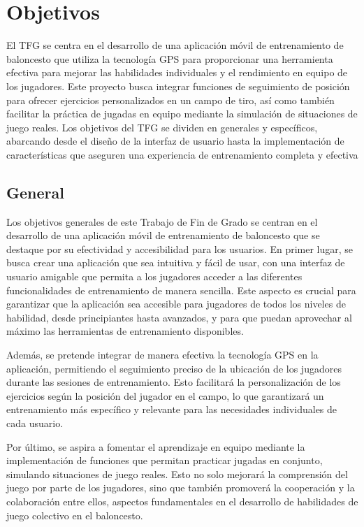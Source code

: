 \chapter{Objetivos}
\label{ch:Objetivos}

El TFG se centra en el desarrollo de una aplicación móvil de entrenamiento de baloncesto que utiliza la tecnología GPS para proporcionar una herramienta efectiva para mejorar las habilidades individuales y el rendimiento en equipo de los jugadores. Este proyecto busca integrar funciones de seguimiento de posición para ofrecer ejercicios personalizados en un campo de tiro, así como también facilitar la práctica de jugadas en equipo mediante la simulación de situaciones de juego reales. Los objetivos del TFG se dividen en generales y específicos, abarcando desde el diseño de la interfaz de usuario hasta la implementación de características que aseguren una experiencia de entrenamiento completa y efectiva

\section{General}

Los objetivos generales de este Trabajo de Fin de Grado se centran en el desarrollo de una aplicación móvil de entrenamiento de baloncesto que se destaque por su efectividad y accesibilidad para los usuarios. En primer lugar, se busca crear una aplicación que sea intuitiva y fácil de usar, con una interfaz de usuario amigable que permita a los jugadores acceder a las diferentes funcionalidades de entrenamiento de manera sencilla. Este aspecto es crucial para garantizar que la aplicación sea accesible para jugadores de todos los niveles de habilidad, desde principiantes hasta avanzados, y para que puedan aprovechar al máximo las herramientas de entrenamiento disponibles.

Además, se pretende integrar de manera efectiva la tecnología GPS en la aplicación, permitiendo el seguimiento preciso de la ubicación de los jugadores durante las sesiones de entrenamiento. Esto facilitará la personalización de los ejercicios según la posición del jugador en el campo, lo que garantizará un entrenamiento más específico y relevante para las necesidades individuales de cada usuario.

Por último, se aspira a fomentar el aprendizaje en equipo mediante la implementación de funciones que permitan practicar jugadas en conjunto, simulando situaciones de juego reales. Esto no solo mejorará la comprensión del juego por parte de los jugadores, sino que también promoverá la cooperación y la colaboración entre ellos, aspectos fundamentales en el desarrollo de habilidades de juego colectivo en el baloncesto.

